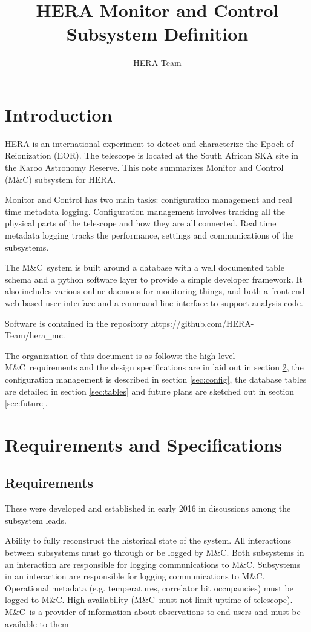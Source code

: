 \documentclass{article}
\newcommand{\mc}{M\&C}
\begin{document}
\author{HERA Team}
\title{HERA Monitor and Control Subsystem Definition}
\maketitle

\section{Introduction}
HERA is an international experiment to detect and characterize the Epoch of
Reionization (EOR).  The telescope is located at the South African SKA site in
the Karoo Astronomy Reserve.  This note summarizes Monitor and Control (\mc) subsystem for HERA.

Monitor and Control has two main tasks: configuration management and real time metadata logging. Configuration management involves tracking all the physical parts of the telescope and how they are all connected. Real time metadata logging tracks the performance, settings and communications of the subsystems.

The \mc\ system is built around a database with a well documented table schema and a python software layer to provide a simple developer framework. It also includes various online daemons for monitoring things, and both a front end web-based user interface and a command-line interface to support analysis code.

Software is contained in the repository https://github.com/HERA-Team/hera\_mc.

The organization of this document is as follows: the high-level \mc\ requirements and the design specifications are in laid out in section \ref{sec:reqs}, the configuration management is described in section \ref{sec:config}, the database tables are detailed in section \ref{sec:tables} and future plans are sketched out in section \ref{sec:future}.

\section{Requirements and Specifications}
\label{sec:reqs}

\subsection{Requirements}
These were developed and established in early 2016 in discussions among the subsystem leads.

\begin{outline}[enumerate]
	\1 Ability to fully reconstruct the historical state of the system.
	\1 All interactions between subsystems must go through or be logged by \mc.
		\2 Both subsystems in an interaction are responsible for logging communications to \mc.
		\2 Subsystems in an interaction are responsible for logging communications to \mc.
	\1 Operational metadata (e.g. temperatures, correlator bit occupancies) must be logged to \mc.
	\1 High availability (\mc\ must not limit uptime of telescope).
	\1 \mc\ is a provider of information about observations to end-users and must be available to them
\end{outline}
\end{document}

